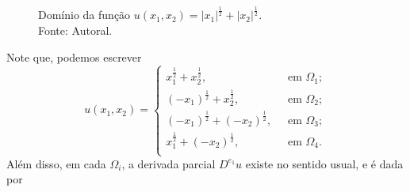 \begin{ex}
\begin{figure}[H]
        \caption{Domínio da função $u(x_1,x_2) = |x_1|^{\frac{1}{2}} + |x_2|^{\frac{1}{2}}$.\\
        Fonte: Autoral.}
        \label{fig:dominio}
    \end{figure}
    Note que, podemos escrever
    \begin{equation}
        u(x_1,x_2) =
        \left\{
            \begin{array}{lr}
                x_1^{\frac{1}{2}} + x_2^{\frac{1}{2}}, &\;\text{ em } \Omega_1;\\
                (-x_1)^{\frac{1}{2}} + x_2^{\frac{1}{2}}, &\;\text{ em } \Omega_2;\\
                (-x_1)^{\frac{1}{2}} + (-x_2)^{\frac{1}{2}}, &\;\text{ em } \Omega_3;\\
                x_1^{\frac{1}{2}} + (-x_2)^{\frac{1}{2}}, &\;\text{ em } \Omega_4.\\
            \end{array}
        \right.
    \end{equation}
    Além disso, em cada $\Omega_i$, a derivada parcial $D^{e_1}u$ existe no sentido usual, e é dada por

\end{ex}
